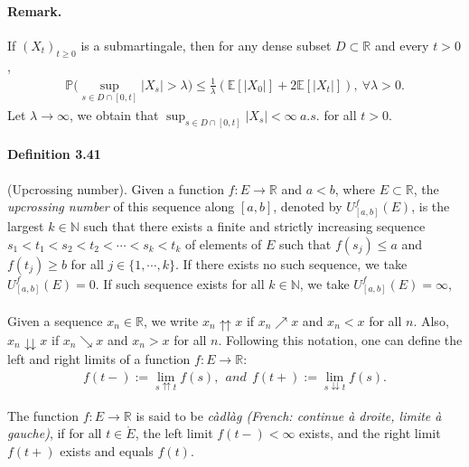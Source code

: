 \documentclass{article}
\numberwithin{equation}{section}
\newcommand{\E}{\mathbb{E}}
\renewcommand{\P}{\mathbb{P}}
\theoremstyle{plain}
\theoremstyle{definition}
\begin{document}
\paragraph{Remark.} If $(X_t)_{t\geq 0}$ is a submartingale, then for any dense subset $D\subset\mathbb{R}$ and every $t>0$,
\begin{align*}
	\P\biggl(\sup_{s\in D\cap[0,t]}\vert X_s\vert>\lambda\biggr)\leq \frac{1}{\lambda}\left(\E[\vert X_0\vert] + 2\E[\vert X_t\vert]\right),\ \forall \lambda>0.
\end{align*}
Let $\lambda\to\infty$, we obtain that $\sup_{s\in D\cap[0,t]}\vert X_s\vert<\infty\ a.s.$ for all $t> 0$.

\paragraph{Definition 3.41\label{def:3.41}} (Upcrossing number). Given a function $f:E\to\mathbb{R}$ and $a<b$, where $E\subset\mathbb{R}$, the \textit{upcrossing number} of this sequence along $[a,b]$, denoted by $U_{[a,b]}^f(E)$, is the largest $k\in\mathbb{N}$ such that there exists a finite and strictly increasing sequence $s_1<t_1<s_2<t_2<\cdots<s_k<t_k$ of elements of $E$ such that $f(s_j)\leq a$ and $f(t_j)\geq b$ for all $j\in\{1,\cdots,k\}$. If there exists no such sequence, we take $U_{[a,b]}^f(E)=0$. If such sequence exists for all $k\in\mathbb{N}$, we take $U_{[a,b]}^f(E)=\infty$,

\paragraph{} Given a sequence $x_n\in\mathbb{R}$, we write $x_n\upuparrows x$ if $x_n\nearrow x$ and $x_n<x$ for all $n$. Also, $x_n\downdownarrows x$ if $x_n\searrow x$ and $x_n>x$ for all $n$. Following this notation, one can define the left and right limits of a function $f:E\to\mathbb{R}$:
\begin{align*}
	f(t-):=\lim_{s\upuparrows t}f(s),\ \ \textit{and}\ \ f(t+):=\lim_{s\downdownarrows t}f(s).
\end{align*}

The function $f:E\to\mathbb{R}$ is said to be \textit{càdlàg (French: continue à droite, limite à gauche)}, if for all $t\in\mathring{E}$, the left limit $f(t-)<\infty$ exists, and the right limit $f(t+)$ exists and equals $f(t)$.
\end{document}
